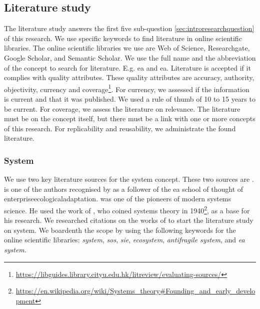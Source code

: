 \subsection{Literature study}
\label{sub:literaturestudy}
The literature study answers the first five sub-question \cref{sec:introresearchquestion} of this research. We use specific keywords to find literature in online scientific libraries. The online scientific libraries we use are Web of Science, Researchgate, Google Scholar, and Semantic Scholar. We use the full name and the abbreviation of the concept to search for literature. E.g. \acrlong{ea} and \acrshort{ea}. Literature is accepted if it complies with quality \glspl{attribute}. These quality \glspl{attribute} are accuracy, authority, objectivity, currency and coverage\footnote{\url{https://libguides.library.cityu.edu.hk/litreview/evaluating-sources/}}. For currency, we assessed if the information is current and that it was published. We used a rule of thumb of 10 to 15 years to be current. For coverage, we assess the literature on relevance. The literature must be on the concept itself, but there must be a link with one or more concepts of this research. For replicability and reusability, we administrate the found literature.

\subsubsection{System}
\label{subsub:system}
We use two key literature sources for the system concept. These two sources are \textcites{Ackoff1973}{Gharajedaghi2011}. \textcite{Gharajedaghi2011} is one of the authors recognised by \textcite{Lapalme2012} as a follower of the \acrlong{ea} school of thought of \gls{enterpriseecologicaladaptation}. \textcite{Ackoff1973} was one of the pioneers of modern systems science. He used the work of  \textcite{Bertalanffy1968}, who coined systems theory in 1940\footnote{\url{https://en.wikipedia.org/wiki/Systems_theory\#Founding_and_early_development}}, as a base for his research. We researched citations on the works of \textcites{Ackoff1973}{Gharajedaghi2011} to start the literature study on system. We boardenth the scope by using the following keywords for the online scientific libraries: \textit{system}, \textit{\acrlong{sos}}, \textit{\acrlong{sie}}, \textit{ecosystem}, \textit{\gls{antifragile} system}, and \textit{\acrlong{ea} system}.

